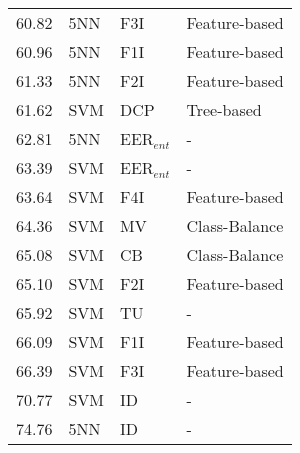 \begin{tabular}{rlll}
60.82 & 5NN & F3I & Feature-based \\
60.96 & 5NN & F1I & Feature-based \\
61.33 & 5NN & F2I & Feature-based \\
61.62 & SVM & DCP & Tree-based \\
62.81 & 5NN & EER$_{ent}$ & - \\
63.39 & SVM & EER$_{ent}$ & - \\
63.64 & SVM & F4I & Feature-based \\
64.36 & SVM & MV & Class-Balance \\
65.08 & SVM & CB & Class-Balance \\
65.10 & SVM & F2I & Feature-based \\
65.92 & SVM & TU & - \\
66.09 & SVM & F1I & Feature-based \\
66.39 & SVM & F3I & Feature-based \\
70.77 & SVM & ID & - \\
74.76 & 5NN & ID & - \\
\bottomrule
\end{tabular}
